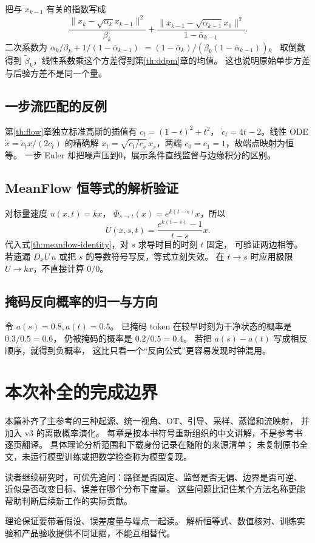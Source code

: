 把与 $x_{k-1}$ 有关的指数写成
\[
\frac{\|x_k-\sqrt{\alpha_k}x_{k-1}\|^2}{\beta_k}
 +\frac{\|x_{k-1}-\sqrt{\bar\alpha_{k-1}}x_0\|^2}{1-\bar\alpha_{k-1}}.
\]
二次系数为 $\alpha_k/\beta_k+1/(1-\bar\alpha_{k-1})$
$=(1-\bar\alpha_k)/(\beta_k(1-\bar\alpha_{k-1}))$。
取倒数得到 $\tilde\beta_k$，线性系数乘这个方差得到第\ref{th:ddpm}章的均值。
这也说明原始单步方差与后验方差不是同一个量。

\subsection{一步流匹配的反例}

第\ref{th:flow}章独立标准高斯的插值有 $c_t=(1-t)^2+t^2$，
$\dot c_t=4t-2$。线性 ODE $\dot x=\dot c_t x/(2c_t)$ 的精确解
$x_t=\sqrt{c_t/c_s}\,x_s$，两端 $c_0=c_1=1$，故端点映射为恒等。
一步 Euler 却把噪声压到0，展示条件直线监督与边缘积分的区别。

\subsection{MeanFlow 恒等式的解析验证}

对标量速度 $u(x,t)=kx$，
$\Phi_{s\to t}(x)=e^{k(t-s)}x$，所以
\[
U(x,s,t)=\frac{e^{k(t-s)}-1}{t-s}x.
\]
代入式\eqref{th:meanflow-identity}，对 $s$ 求导时目的时刻 $t$ 固定，
可验证两边相等。若遗漏 $D_xU\,u$ 或把 $s$ 的导数符号写反，等式立刻失效。
在 $t\to s$ 时应用极限 $U\to kx$，不直接计算 $0/0$。

\subsection{掩码反向概率的归一与方向}

令 $a(s)=0.8,a(t)=0.5$。
已掩码 token 在较早时刻为干净状态的概率是 $0.3/0.5=0.6$，
仍被掩码的概率是 $0.2/0.5=0.4$。
若把 $a(s)-a(t)$ 写成相反顺序，就得到负概率，
这比只看一个“反向公式”更容易发现时钟混用。

\section{本次补全的完成边界}

本篇补齐了主参考的三种起源、统一视角、OT、引导、采样、蒸馏和流映射，
并加入 v3 的离散概率演化。
每章是按本书符号重新组织的中文讲解，不是参考书逐页翻译。
具体理论分析范围和下载身份记录在随附的来源清单；
未复制原书全文，未运行模型训练或把数学检查称为模型复现。

读者继续研究时，可优先追问：路径是否固定、监督是否无偏、边界是否可逆、
近似是否改变目标、误差在哪个分布下度量。
这些问题比记住某个方法名称更能帮助判断后续新工作的实际贡献。

\begin{theorytakeaway}
理论保证要带着假设、误差度量与端点一起读。
解析恒等式、数值核对、训练实验和产品验收提供不同证据，不能互相替代。
\end{theorytakeaway}
